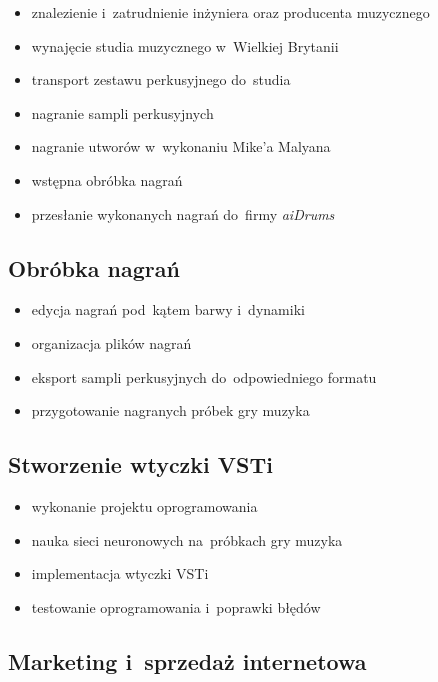 \documentclass[12pt]{article}
\newcommand{\nazwafirmy}{aiDrums\xspace}
\begin{document}
\begin{itemize}
    \item znalezienie i~zatrudnienie inżyniera oraz producenta muzycznego
    \item wynajęcie studia muzycznego w~Wielkiej Brytanii
    \item transport zestawu perkusyjnego do~studia
    \item nagranie sampli perkusyjnych
    \item nagranie utworów w~wykonaniu Mike'a Malyana
    \item wstępna obróbka nagrań
    \item przesłanie wykonanych nagrań do~firmy \textit{\nazwafirmy}
\end{itemize}

\subsection{Obróbka nagrań}

\begin{itemize}
    \item edycja nagrań pod~kątem barwy i~dynamiki
    \item organizacja plików nagrań
    \item eksport sampli perkusyjnych do~odpowiedniego formatu
    \item przygotowanie nagranych próbek gry muzyka
\end{itemize}

\subsection{Stworzenie wtyczki VSTi}

\begin{itemize}
    \item wykonanie projektu oprogramowania
    \item nauka sieci neuronowych na~próbkach gry muzyka
    \item implementacja wtyczki VSTi
    \item testowanie oprogramowania i~poprawki błędów
\end{itemize}

\subsection{Marketing i~sprzedaż internetowa}
\end{document}
